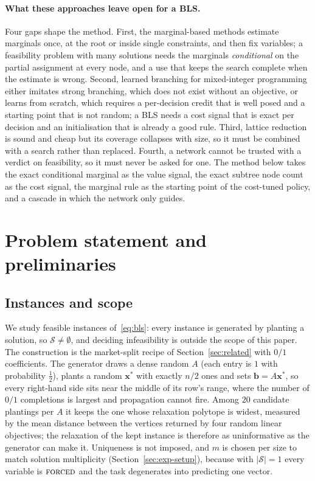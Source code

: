 \documentclass[final,5p,times,twocolumn,authoryear]{elsarticle}
\newcommand{\SOL}{\mathcal{S}}
\newcommand{\FORCED}{\textsc{forced}}
\begin{document}
\paragraph{What these approaches leave open for a BLS.} Four gaps shape the method. First, the marginal-based methods estimate marginals once, at the root or inside single constraints, and then fix variables; a feasibility problem with many solutions needs the marginals \emph{conditional} on the partial assignment at every node, and a use that keeps the search complete when the estimate is wrong. Second, learned branching for mixed-integer programming either imitates strong branching, which does not exist without an objective, or learns from scratch, which requires a per-decision credit that is well posed and a starting point that is not random; a BLS needs a cost signal that is exact per decision and an initialisation that is already a good rule. Third, lattice reduction is sound and cheap but its coverage collapses with size, so it must be combined with a search rather than replaced. Fourth, a network cannot be trusted with a verdict on feasibility, so it must never be asked for one. The method below takes the exact conditional marginal as the value signal, the exact subtree node count as the cost signal, the marginal rule as the starting point of the cost-tuned policy, and a cascade in which the network only guides.

\section{Problem statement and preliminaries}
\label{sec:problem}

\subsection{Instances and scope}
\label{sec:problem-instances}

We study feasible instances of~\eqref{eq:bls}: every instance is generated by planting a solution, so $\SOL\neq\emptyset$, and deciding infeasibility is outside the scope of this paper. The construction is the market-split recipe of Section~\ref{sec:related} with $0/1$ coefficients. The generator draws a dense random $A$ (each entry is $1$ with probability $\frac12$), plants a random $\mathbf{x}^\ast$ with exactly $n/2$ ones and sets $\mathbf{b}=A\mathbf{x}^\ast$, so every right-hand side sits near the middle of its row's range, where the number of $0/1$ completions is largest and propagation cannot fire. Among $20$ candidate plantings per $A$ it keeps the one whose relaxation polytope is widest, measured by the mean distance between the vertices returned by four random linear objectives; the relaxation of the kept instance is therefore as uninformative as the generator can make it. Uniqueness is not imposed, and $m$ is chosen per size to match solution multiplicity (Section~\ref{sec:exp-setup}), because with $|\SOL|=1$ every variable is $\FORCED$ and the task degenerates into predicting one vector.
\end{document}
